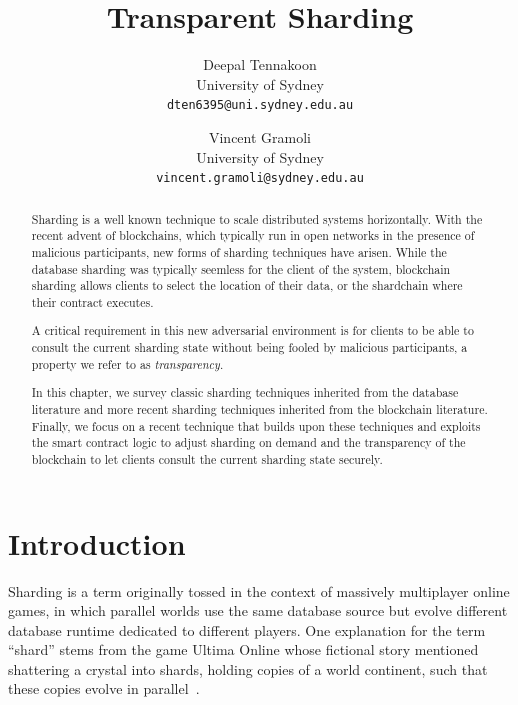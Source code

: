 \documentclass[11pt,dvipdfm]{article}
\begin{document}
\title{Transparent Sharding}
\author{Deepal Tennakoon\\
{University of Sydney}\\
\texttt{dten6395@uni.sydney.edu.au} 
\and Vincent Gramoli\\
{University of Sydney}\\
\texttt{vincent.gramoli@sydney.edu.au}}

\maketitle

\begin{abstract}
 Sharding is a well known technique to scale distributed systems horizontally.
 With the recent advent of blockchains, which typically run in open networks in the presence of  malicious participants, new forms of sharding techniques have arisen. 
 While the database sharding was typically seemless for the client of the system, blockchain sharding 
 allows clients to select the location of their data, or the shardchain where their contract executes.
 
 A critical requirement in this new adversarial environment is for clients to be able to consult the 
 current sharding state without being fooled by malicious participants, a property we refer to as \emph{transparency}.
 
 In this chapter, we survey classic sharding techniques inherited from the database literature 
 and more recent sharding techniques inherited from the blockchain literature. Finally, we focus on a  recent technique that builds upon these techniques and exploits the 
 smart contract logic to adjust sharding on demand and the transparency of the blockchain
 to let clients consult the current sharding state securely.
\end{abstract}

\section{Introduction}
Sharding is a term originally tossed in the context of massively multiplayer online games, in which parallel
worlds use the same database source but evolve different database runtime dedicated to different players. One explanation for the term ``shard'' stems from the game Ultima Online whose fictional story mentioned shattering a crystal into shards,  holding copies of a world continent, such that these copies evolve in parallel~\cite{Ko09}.
\end{document}
